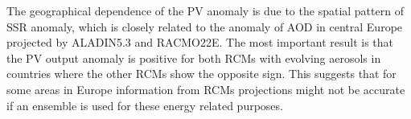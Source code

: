 

The geographical dependence of the PV anomaly is due to the spatial pattern of SSR anomaly, which is closely related to the anomaly of AOD in central Europe projected by ALADIN5.3 and RACMO22E. The most important result is that the PV output anomaly is positive for both RCMs with evolving aerosols in countries where the other RCMs show the opposite sign. This suggests that for some areas in Europe information from RCMs projections might not be accurate if an ensemble is used for these energy related purposes.

